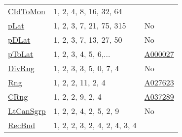{\begin{tabular}{|l|l|l|}
\hyperlink{CIdToMon}{CIdToMon}& 1, 2, 4, 8, 16, 32, 64 &\\
\hyperlink{pLat}{pLat}& 1, 2, 3, 7, 21, 75, 315 &No\\
\hyperlink{pDLat}{pDLat}& 1, 2, 3, 7, 13, 27, 50 &No\\
\hyperlink{pToLat}{pToLat}& 1, 2, 3, 4, 5, 6,... &\href{http://oeis.org/A000027}{A000027}\\
\hyperlink{DivRng}{DivRng}& 1, 2, 3, 3, 5, 0, 7, 4 &No\\
\hyperlink{Rng}{Rng}& 1, 2, 2, 11, 2, 4 &\href{http://oeis.org/A027623}{A027623}\\
\hyperlink{CRng}{CRng}& 1, 2, 2, 9, 2, 4 &\href{http://oeis.org/A037289}{A037289}\\
\hyperlink{LtCanSgrp}{LtCanSgrp}& 1, 2, 2, 4, 2, 5, 2, 9 &No\\
\hyperlink{RecBnd}{RecBnd}& 1, 2, 2, 3, 2, 4, 2, 4, 3, 4 &\\
\end{tabular}

}
